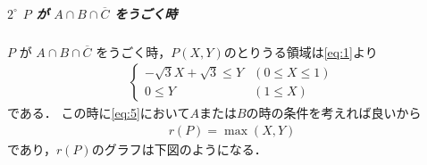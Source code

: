 \documentclass[../../main.tex]{subfiles}
\begin{document}


\subparagraph{$2^\circ$ $P$ が $A \cap B \cap \overline{C}$ をうごく時}

$P$ が $A \cap B \cap \overline{C}$ をうごく時，$P(X,Y)$のとりうる領域は\cref{eq:1}より
\begin{align}
  \begin{cases}
    -\sqrt{3}X + \sqrt{3} \le Y & (0 \le X \le 1) \\
    0 \le Y & (1 \le X)
  \end{cases}
\end{align}
である．
この時に\cref{eq:5}において$A$または$B$の時の条件を考えれば良いから
\begin{align}
  r(P) = \max(X,Y)
\end{align}
であり，$r(P)$のグラフは下図のようになる．
\end{document}
